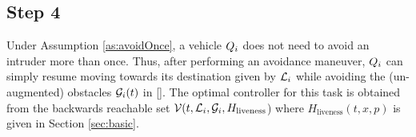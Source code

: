 \subsection{Step 4}
Under Assumption \ref{as:avoidOnce}, a vehicle $Q_{i}$ does not need to avoid an intruder more than once. Thus, after performing an avoidance maneuver, $Q_{i}$ can simply resume moving towards its destination given by $\mathcal{L}_i$ while avoiding the (un-augmented) obstacles $\mathcal{G}_i(t)$ in \eqref{}. The optimal controller for this task is obtained from the backwards reachable set $\mathcal{V}(t, \mathcal{L}_i, \mathcal{G}_i, H_\text{liveness}$) where $H_\text{liveness}(t, x, p)$ is given in Section \ref{sec:basic}.